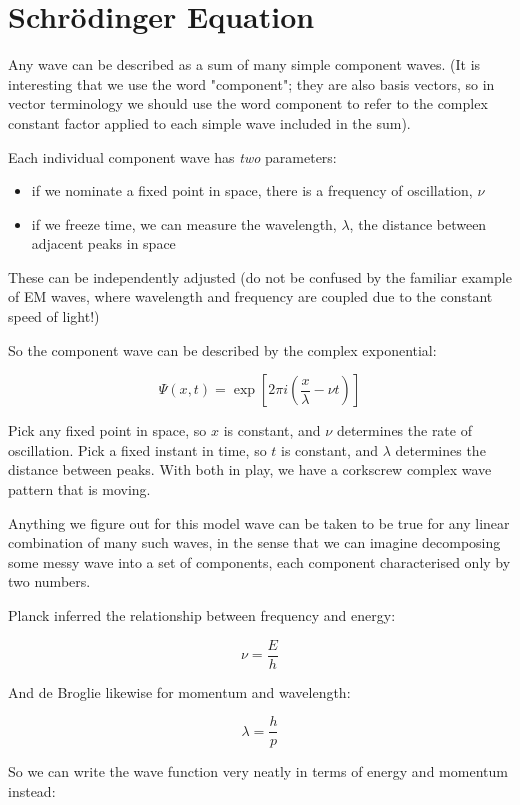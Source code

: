\section{Schrödinger Equation}

Any wave can be described as a sum of many simple component waves. (It is interesting that we use the word "component"; they are also basis vectors, so in vector terminology we should use the word component to refer to the complex constant factor applied to each simple wave included in the sum).

Each individual component wave has \textit{two} parameters:

\begin{itemize}
  \item if we nominate a fixed point in space, there is a frequency of oscillation, $\nu$
  \item if we freeze time, we can measure the wavelength, $\lambda$, the distance between adjacent peaks in space
\end{itemize}

These can be independently adjusted (do not be confused by the familiar example of EM waves, where wavelength and frequency are coupled due to the constant speed of light!)

So the component wave can be described by the complex exponential:

$$
\Psi(x, t) = \exp \left[ 2\pi i(\frac{x}{\lambda} - \nu t) \right]
$$

Pick any fixed point in space, so $x$ is constant, and $\nu$ determines the rate of oscillation. Pick a fixed instant in time, so $t$ is constant, and $\lambda$ determines the distance between peaks. With both in play, we have a corkscrew complex wave pattern that is moving.

Anything we figure out for this model wave can be taken to be true for any linear combination of many such waves, in the sense that we can imagine decomposing some messy wave into a set of components, each component characterised only by two numbers.

Planck inferred the relationship between frequency and energy:

$$\nu = \frac{E}{h}$$

And de Broglie likewise for momentum and wavelength:

$$\lambda = \frac{h}{p}$$

So we can write the wave function very neatly in terms of energy and momentum instead:

